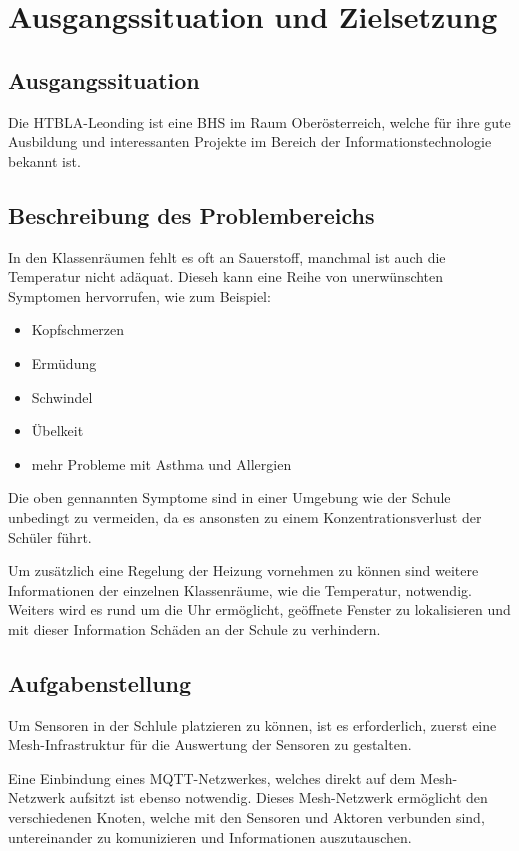 \chapter{Ausgangssituation und Zielsetzung}

\section{Ausgangssituation}
Die HTBLA-Leonding ist eine BHS im Raum Oberösterreich, welche für ihre gute Ausbildung und interessanten Projekte im Bereich der Informationstechnologie bekannt ist.

\section{Beschreibung des Problembereichs}
In den Klassenräumen fehlt es oft an Sauerstoff, manchmal ist auch die Temperatur nicht adäquat. Dieseh kann eine Reihe von unerwünschten Symptomen hervorrufen, wie zum Beispiel: 

\begin{itemize}
    \item Kopfschmerzen
    \item Ermüdung
    \item Schwindel
    \item Übelkeit
    \item mehr Probleme mit Asthma und Allergien
\end{itemize}

Die oben gennannten Symptome sind in einer Umgebung wie der Schule unbedingt zu vermeiden, da es ansonsten zu einem Konzentrationsverlust der Schüler führt.

Um zusätzlich eine Regelung der Heizung vornehmen zu können sind weitere Informationen der einzelnen Klassenräume, wie die Temperatur, notwendig. Weiters wird es rund um die Uhr ermöglicht,  geöffnete Fenster zu lokalisieren und mit dieser Information Schäden an der Schule zu verhindern.

\section{Aufgabenstellung}
Um Sensoren in der Schlule platzieren zu können, ist es erforderlich, zuerst eine Mesh-Infrastruktur für die Auswertung der Sensoren zu gestalten.

Eine Einbindung eines MQTT-Netzwerkes, welches direkt auf dem Mesh-Netzwerk aufsitzt ist ebenso notwendig. Dieses Mesh-Netzwerk ermöglicht den verschiedenen Knoten, welche mit den Sensoren und Aktoren verbunden sind, untereinander zu komunizieren und Informationen auszutauschen.

